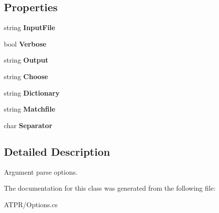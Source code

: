 \subsection*{Properties}
\begin{DoxyCompactItemize}
\item 
\hypertarget{class_a_t_p_r_1_1_options_ac0a2d51d6f7ef81700651d3951f51e4f}{}\label{class_a_t_p_r_1_1_options_ac0a2d51d6f7ef81700651d3951f51e4f} 
string {\bfseries Input\+File}
\item 
\hypertarget{class_a_t_p_r_1_1_options_a8cb44ee6dbab360a3d9412626c2fa2d9}{}\label{class_a_t_p_r_1_1_options_a8cb44ee6dbab360a3d9412626c2fa2d9} 
bool {\bfseries Verbose}
\item 
\hypertarget{class_a_t_p_r_1_1_options_a933d1d83e25d63f9b006c48efe3b4fd1}{}\label{class_a_t_p_r_1_1_options_a933d1d83e25d63f9b006c48efe3b4fd1} 
string {\bfseries Output}
\item 
\hypertarget{class_a_t_p_r_1_1_options_a2b57c8aeea07cb4359ca235c24cd6cfe}{}\label{class_a_t_p_r_1_1_options_a2b57c8aeea07cb4359ca235c24cd6cfe} 
string {\bfseries Choose}
\item 
\hypertarget{class_a_t_p_r_1_1_options_a5187c31694e58eb5cd7464b3c1f5eacc}{}\label{class_a_t_p_r_1_1_options_a5187c31694e58eb5cd7464b3c1f5eacc} 
string {\bfseries Dictionary}
\item 
\hypertarget{class_a_t_p_r_1_1_options_a1c3b8649759e59e1b6f0e5a8987cb3f5}{}\label{class_a_t_p_r_1_1_options_a1c3b8649759e59e1b6f0e5a8987cb3f5} 
string {\bfseries Matchfile}
\item 
\hypertarget{class_a_t_p_r_1_1_options_ab40c002e4eeede247c68606cb3481a0f}{}\label{class_a_t_p_r_1_1_options_ab40c002e4eeede247c68606cb3481a0f} 
char {\bfseries Separator}
\end{DoxyCompactItemize}


\subsection{Detailed Description}
Argument parse options. 



The documentation for this class was generated from the following file\+:\begin{DoxyCompactItemize}
\item 
A\+T\+P\+R/Options.\+cs\end{DoxyCompactItemize}
